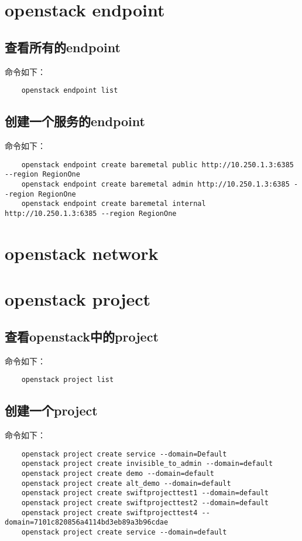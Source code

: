 \documentclass[a4paper,left=1.5cm,right=1.5cm,11pt]{article}
\begin{document}
\tableofcontents

\clearpage

\section{openstack endpoint}
\subsection{查看所有的endpoint}
	命令如下：
	\begin{lstlisting}
	openstack endpoint list
	\end{lstlisting}

\subsection{创建一个服务的endpoint}
	命令如下：
	\begin{lstlisting}
	openstack endpoint create baremetal public http://10.250.1.3:6385 --region RegionOne
	openstack endpoint create baremetal admin http://10.250.1.3:6385 --region RegionOne
	openstack endpoint create baremetal internal http://10.250.1.3:6385 --region RegionOne
	\end{lstlisting}

\section{openstack network}

\section{openstack project}
\subsection{查看openstack中的project}
	命令如下：
	\begin{lstlisting}
	openstack project list
	\end{lstlisting}

\subsection{创建一个project}
	命令如下：
	\begin{lstlisting}
	openstack project create service --domain=Default
	openstack project create invisible_to_admin --domain=default
	openstack project create demo --domain=default
	openstack project create alt_demo --domain=default
	openstack project create swiftprojecttest1 --domain=default
	openstack project create swiftprojecttest2 --domain=default
	openstack project create swiftprojecttest4 --domain=7101c820856a4114bd3eb89a3b96cdae
	openstack project create service --domain=default
	\end{lstlisting}
\end{document}
